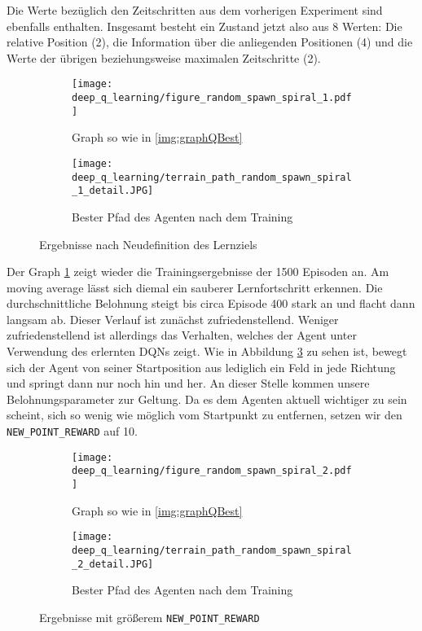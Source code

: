 Die Werte bezüglich den Zeitschritten aus dem vorherigen Experiment sind ebenfalls enthalten. Insgesamt besteht ein Zustand jetzt also aus 8 Werten: Die relative Position (2), die Information über die anliegenden Positionen (4) und die Werte der übrigen beziehungsweise maximalen Zeitschritte (2).
\begin{figure}[h!]
    \centering
    \begin{subfigure}[b]{0.59\textwidth}
        \texttt{[image: deep\_q\_learning/figure\_random\_spawn\_spiral\_1.pdf]}
        \caption{Graph so wie in \ref{img:graphQBest}}
        \label{img:graphDeepQRandomSpawnSpiral1}
    \end{subfigure}
    \begin{subfigure}[b]{0.4\textwidth}
        \texttt{[image: deep\_q\_learning/terrain\_path\_random\_spawn\_spiral\_1\_detail.JPG]}
        \caption{Bester Pfad des Agenten nach dem Training}
        \label{img:pathDeepQRandomSpawnSpiral1}
    \end{subfigure}
    \caption{Ergebnisse nach Neudefinition des Lernziels}
\end{figure}
Der Graph \ref{img:graphDeepQRandomSpawnSpiral1} zeigt wieder die Trainingsergebnisse der 1500 Episoden an. Am moving average lässt sich diemal ein sauberer Lernfortschritt erkennen. Die durchschnittliche Belohnung steigt bis circa Episode 400 stark an und flacht dann langsam ab. Dieser Verlauf ist zunächst zufriedenstellend. Weniger zufriedenstellend ist allerdings das Verhalten, welches der Agent unter Verwendung des erlernten DQNs zeigt. Wie in Abbildung \ref{img:pathDeepQRandomSpawnSpiral1} zu sehen ist, bewegt sich der Agent von seiner Startposition aus lediglich ein Feld in jede Richtung und springt dann nur noch hin und her.
An dieser Stelle kommen unsere Belohnungsparameter zur Geltung. Da es dem Agenten aktuell wichtiger zu sein scheint, sich so wenig wie möglich vom Startpunkt zu entfernen, setzen wir den \texttt{NEW_POINT_REWARD} auf 10.
\begin{figure}[h!]
    \centering
    \begin{subfigure}[b]{0.59\textwidth}
        \texttt{[image: deep\_q\_learning/figure\_random\_spawn\_spiral\_2.pdf]}
        \caption{Graph so wie in \ref{img:graphQBest}}
        \label{img:graphDeepQRandomSpawnSpiral2}
    \end{subfigure}
    \begin{subfigure}[b]{0.4\textwidth}
        \texttt{[image: deep\_q\_learning/terrain\_path\_random\_spawn\_spiral\_2\_detail.JPG]}
        \caption{Bester Pfad des Agenten nach dem Training}
        \label{img:pathDeepQRandomSpawnSpiral2}
    \end{subfigure}
    \caption{Ergebnisse mit größerem \texttt{NEW_POINT_REWARD}}
\end{figure}
